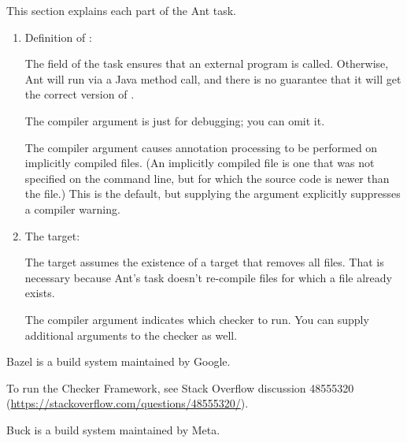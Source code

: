 
This section explains each part of the Ant task.

\begin{enumerate}
\item Definition of :

The  field of the  task
ensures that an external  program is called.  Otherwise, Ant will run
 via a Java method call, and there is no guarantee that it will get
the correct version of .

The  compiler argument is just for debugging; you can omit
it.

The  compiler argument causes annotation processing
to be performed on implicitly compiled files.  (An implicitly compiled file
is one that was not specified on the command line, but for which the source
code is newer than the  file.)  This is the default, but
supplying the argument explicitly suppresses a compiler warning.


\item The  target:

The target assumes the existence of a  target that removes all
 files.  That is necessary because Ant's  task
doesn't re-compile  files for which a  file
already exists.

The  compiler argument indicates which checker to
run.  You can supply additional arguments to the checker as well.

\end{enumerate}



Bazel is a build system maintained by Google.

To run the Checker Framework, see Stack Overflow discussion 48555320
({\codesize\url{https://stackoverflow.com/questions/48555320/}}).



Buck is a build system maintained by Meta.

